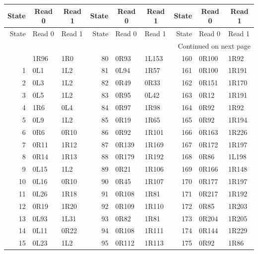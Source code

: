 \begingroup
\small\ttfamily
\setlength{\tabcolsep}{5pt}
\begin{longtable}{rll@{\hspace{1.3em}}rll@{\hspace{1.3em}}rll}
\toprule
\multicolumn{1}{c}{\normalfont State}&\multicolumn{1}{c}{\normalfont Read 0}&\multicolumn{1}{c}{\normalfont Read 1}&\multicolumn{1}{c}{\normalfont State}&\multicolumn{1}{c}{\normalfont Read 0}&\multicolumn{1}{c}{\normalfont Read 1}&\multicolumn{1}{c}{\normalfont State}&\multicolumn{1}{c}{\normalfont Read 0}&\multicolumn{1}{c}{\normalfont Read 1}\\
\midrule
\endfirsthead
\toprule
\normalfont State&\normalfont Read 0&\normalfont Read 1&\normalfont State&\normalfont Read 0&\normalfont Read 1&\normalfont State&\normalfont Read 0&\normalfont Read 1\\
\midrule
\endhead
\midrule
\multicolumn{9}{r}{\normalfont\small Continued on next page}\\
\endfoot
\bottomrule
\endlastfoot
0 & 1R96 & 1R0 & 80 & 0R93 & 1L153 & 160 & 0R100 & 1R92 \\
1 & 0L1 & 1L2 & 81 & 0L94 & 1R57 & 161 & 0R100 & 1R191 \\
2 & 0L3 & 1L2 & 82 & 0R49 & 0R33 & 162 & 0R151 & 1R170 \\
3 & 0L5 & 1L2 & 83 & 0R95 & 0L42 & 163 & 0R12 & 1R191 \\
4 & 1R6 & 0L4 & 84 & 0R97 & 1R98 & 164 & 0R92 & 1R92 \\
5 & 0L9 & 1L2 & 85 & 0R19 & 1R65 & 165 & 0R92 & 1R194 \\
6 & 0R6 & 0R10 & 86 & 0R92 & 1R101 & 166 & 0R163 & 1R226 \\
7 & 0R11 & 1R12 & 87 & 0R139 & 1R169 & 167 & 0R172 & 1R197 \\
8 & 0R14 & 1R13 & 88 & 0R179 & 1R192 & 168 & 0R86 & 1L198 \\
9 & 0L15 & 1L2 & 89 & 0R21 & 1R106 & 169 & 0R166 & 1R148 \\
10 & 0L16 & 0R10 & 90 & 0R45 & 1R107 & 170 & 0R177 & 1R197 \\
11 & 0L26 & 1R18 & 91 & 0R108 & 1R81 & 171 & 0R217 & 1R192 \\
12 & 0R19 & 1R20 & 92 & 0R109 & 1R110 & 172 & 0R85 & 1R203 \\
13 & 0L93 & 1L31 & 93 & 0R82 & 1R81 & 173 & 0R204 & 1R205 \\
14 & 0L11 & 0R22 & 94 & 0R108 & 1R111 & 174 & 0R144 & 1R229 \\
15 & 0L23 & 1L2 & 95 & 0R112 & 1R113 & 175 & 0R92 & 1R86 \\

\end{longtable}
